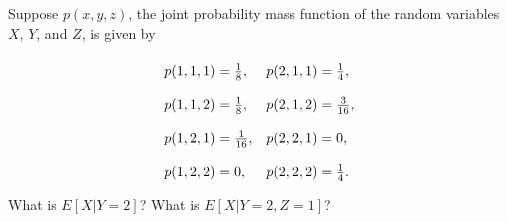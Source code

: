 \begin{problem}{3.7}
  Suppose $p(x, y, z)$, the joint probability mass function of the random variables
  $X$, $Y$, and $Z$, is given by
  \begin{align*}
    \renewcommand\arraystretch{2}
    \begin{array}{ll}
      p(1, 1, 1) = \frac{1}{8}, & p(2, 1, 1) = \frac{1}{4},\\
      p(1, 1, 2) = \frac{1}{8}, & p(2, 1, 2) = \frac{3}{16},\\
      p(1, 2, 1) = \frac{1}{16}, & p(2, 2, 1) = 0,\\
      p(1, 2, 2) = 0, & p(2, 2, 2) = \frac{1}{4}.
    \end{array}
  \end{align*}
  What is $E[X | Y=2]$? What is $E[X|Y=2, Z=1]$?
\end{problem}

